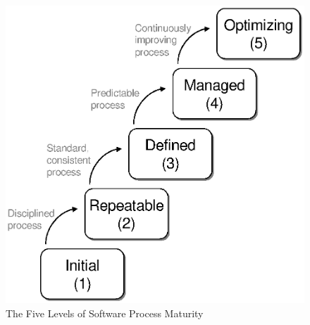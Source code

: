 \begin{figure}[t]
\begin{center}
\includegraphics{figures/CMMMaturityLevels.eps}
\end{center}
\caption{The Five Levels of Software Process Maturity}
\label{fig:cmm-levels}
\end{figure}

